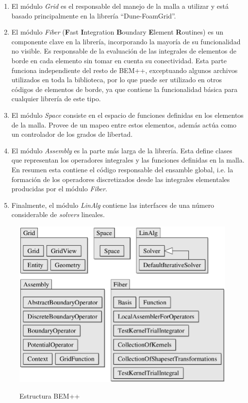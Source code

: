 \documentclass[12pt,letterpaper]{article}
\numberwithin{equation}{section}
\begin{document}
\begin{enumerate}
	\item El módulo \textit{Grid} es el responsable del manejo de la malla a utilizar y está basado principalmente en la librería ``Dune-FoamGrid''.
	\item El módulo \textit{Fiber} (\textbf{F}ast \textbf{I}ntegration \textbf{B}oundary \textbf{E}lement \textbf{R}outines) es un componente clave en la librería, incorporando la mayoría de su funcionalidad no visible. Es responsable de la evaluación de las integrales de elementos de borde en cada elemento sin tomar en cuenta su conectividad. Esta parte funciona independiente del resto de BEM++, exceptuando algunos archivos utilizados en toda la biblioteca, por lo que puede ser utilizado en otros códigos de elementos de borde, ya que contiene la funcionalidad básica para cualquier librería de este tipo.
	\item El módulo \textit{Space} consiste en el espacio de funciones definidas en los elementos de la malla. Provee de un mapeo entre estos elementos, además actúa como un controlador de los grados de libertad.
	\item El módulo \textit{Assembly} es la parte más larga de la librería. Esta define clases que representan los operadores integrales y las funciones definidas en la malla. En resumen esta contiene el código responsable del ensamble global, i.e. la formación de los operadores discretizados desde las integrales elementales producidas por el módulo \textit{Fiber}.
	\item Finalmente, el módulo \textit{LinAlg} contiene las interfaces de una número considerable de \textit{solvers} lineales.
\end{enumerate}

	
\begin{figure}[H]
	\centering\includegraphics[scale=0.4]{Imagenes/Partesbempp.png}\\
	\caption{Estructura BEM++}
	\label{fig:Partesbempp}
\end{figure} 
\end{document}
